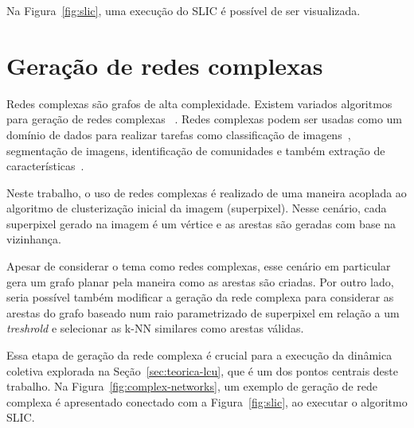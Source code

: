 Na Figura~\ref{fig:slic}, uma execução do SLIC é possível de ser visualizada.
\begin{figure}[h!]
        \captionsetup{width=12cm}
		\centering
\end{figure}


\section{Geração de redes complexas}\label{sec:teorica-redes-complexas}

Redes complexas são grafos de alta complexidade. Existem variados
algoritmos para geração de redes complexas
~\cite{ComplexNetworksSurvey2007}. Redes complexas podem ser usadas
como um domínio de dados para realizar tarefas como classificação de
imagens~\cite{ComplexNetworksImageClassification2015}, segmentação de
imagens, identificação de comunidades e também extração de
características~\cite{JarbasComplexNetworks2020}.

Neste trabalho, o uso de redes complexas é realizado de uma maneira
acoplada ao algoritmo de clusterização inicial da imagem
(superpixel). Nesse cenário, cada superpixel gerado na imagem é um
vértice e as arestas são geradas com base na vizinhança.

Apesar de considerar o tema como redes complexas, esse cenário em
particular gera um grafo planar pela maneira como as arestas são
criadas. Por outro lado, seria possível também modificar a geração da
rede complexa para considerar as arestas do grafo baseado num raio
parametrizado de superpixel em relação a um \textit{treshrold} e
selecionar as \gls{k-NN} similares como arestas válidas.

Essa etapa de geração da rede complexa é crucial para a execução da
dinâmica coletiva explorada na Seção~\ref{sec:teorica-lcu}, que é um dos
pontos centrais deste trabalho. Na Figura~\ref{fig:complex-networks},
um exemplo de geração de rede complexa é apresentado conectado com a
Figura~\ref{fig:slic}, ao executar o algoritmo SLIC.\@


